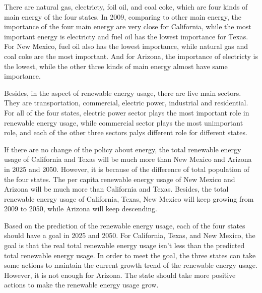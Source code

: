 \documentclass[letterpaper,11pt]{texMemo} %
\begin{document}
\maketitle %

\par There are natural gas, electricty, foil oil, and coal coke, which are four kinds of main energy of the four states. In 2009, comparing to other main energy, the importance of the four main energy are very close for California, while the most important energy is electricty and fuel oil has the lowest importance for Texas. For New Mexico, fuel oil also has the lowest importance, while natural gas and coal coke are the most important. And for Arizona, the importance of electricty is the lowest, while the other three kinds of main energy almost have same importance.
\par Besides, in the aspect of renewable energy usage, there are five main sectors. They are transportation, commercial, electric power, industrial and residential. For all of the four states, electric power sector plays the most important role in renewable energy usage, while commercial sector plays the most unimportant role, and each of the other three sectors palys different role for different states.
\par If there are no change of the policy about energy, the total renewable energy usage of California and Texas will be much more than New Mexico and Arizona in 2025 and 2050. However, it is because of the difference of total population of the four states. The per capita renewable energy usage of New Mexico and Arizona will be much more than California and Texas. Besides, the total renewable energy usage of California, Texas, New Mexico will keep growing from 2009 to 2050, while Arizona will keep descending.
\par Based on the prediction of the renewable energy usage, each of the four states should have a goal in 2025 and 2050. For California, Texas, and New Mexico, the goal is that the real total renewable energy usage isn't less than the predicted total renewable energy usage. In order to meet the goal, the three states can take some actions to maintain the current growth trend of the renewable energy usage. However, it is not enough for Arizona. The state should take more positive actions to make the renewable energy usage grow.


\end{document}
